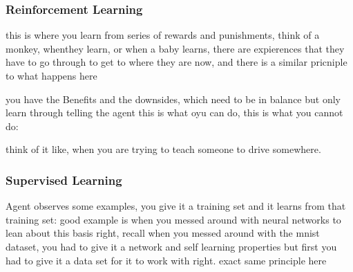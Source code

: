 \documentclass{article}
\theoremstyle{mytheoremstyle}
\theoremstyle{mytheoremstyle}
\theoremstyle{myproblemstyle}
\begin{document}
\subsubsection{Reinforcement Learning}
\begin{definition}
	this is where you learn from series of rewards and punishments, think of a monkey, whenthey learn, or when a baby learns, there are expierences that they have to go through to get to where they are now, and there is a similar pricniple to what happens here

	you have the Benefits and the downsides, which need to be in balance but only learn through telling the agent this is what oyu can do, this is what you cannot do:

	think of it like, when you are trying to teach someone to drive somewhere.

\end{definition}
\subsubsection{Supervised Learning}
\begin{definition}
	Agent observes some examples, you give it a training set and it learns from that training set: good example is when you messed around with neural networks to lean about this basis right, recall when you messed around with the mnist dataset, you had to give it a network and self learning properties but first you had to give it a data set for it to work with right.
	exact same principle here

\end{definition}
\end{document}
